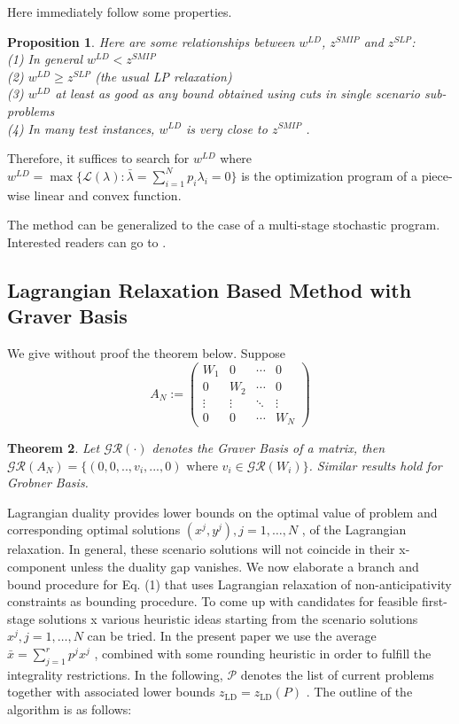 \documentclass{article}
\theoremstyle{plain}
\newtheorem{theorem}{Theorem}[section]
\newtheorem{proposition}[theorem]{Proposition}
\theoremstyle{definition}
\begin{document}
Here immediately follow some properties.

\begin{proposition} Here are some relationships between $w^{L D}$, $z^{S M I P}$ and $z^{S L P}$: \\
\indent (1) In general  $w^{L D}<z^{S M I P} $ \\
\indent (2)  $w^{L D} \geq z^{S L P}$  (the usual LP relaxation) \\
\indent (3) $w^{L D}$  at least as good as any bound obtained using cuts in single scenario sub-problems \\
\indent (4)  In many test instances,  $w^{L D}$  is very close to  $z^{S M I P}$ . \\
\end{proposition}

Therefore, it suffices to search for $w^{L D}$ where $w^{L D}=\max\{\mathcal{L}(\lambda):\bar{\lambda}=  \sum_{i=1}^{N}p_i\lambda_i=0\}$ is the optimization program of a piece-wise linear and convex function.

The method can be generalized to the case of a multi-stage stochastic program.  Interested readers can go to \cite{Caroe and Schultz 1997}.

\subsection{Lagrangian Relaxation Based Method with Graver Basis}
We give without proof the theorem below.  Suppose 
$$
A_N:=\left(\begin{array}{ccccc}
W_1 & 0 & \cdots & 0 \\
 0 & W_2 & \cdots & 0 \\
\vdots & \vdots & \ddots & \vdots  \\
 0 & 0 & \cdots & W_N
\end{array}\right)
$$
\begin{theorem}
Let $\mathcal{GR}(\cdot)$ denotes the Graver Basis of a matrix, then  $\mathcal{GR}(A_N)=\{(0,0,..,v_i,...,0)\text{ where } v_i\in \mathcal{GR}(W_i)\}$. Similar results hold for Grobner Basis.
\end{theorem}

Lagrangian duality provides lower bounds on the optimal value of problem and corresponding optimal solutions  $\left(x^{j}, y^{j}\right), j=1, \ldots, N$ , of the Lagrangian relaxation. In general, these scenario solutions will not coincide in their  x-component unless the duality gap vanishes. We now elaborate a branch and bound procedure for Eq. (1) that uses Lagrangian relaxation of non-anticipativity constraints as bounding procedure. To come up with candidates for feasible first-stage solutions  x  various heuristic ideas starting from the scenario solutions  $x^{j}, j=1, \ldots, N$ can be tried. In the present paper we use the average  $\bar{x}=\sum_{j=1}^{r} p^{j} x^{j}$ , combined with some rounding heuristic in order to fulfill the integrality restrictions. In the following,  $\mathscr{P}$  denotes the list of current problems together with associated lower bounds  $z_{\mathrm{L D}}=z_{\mathrm{L D}}(P)$ . The outline of the algorithm is as follows:
\end{document}
